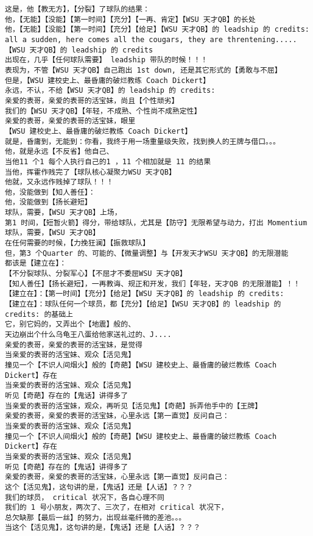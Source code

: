 \documentclass[9pt, b5paper]{article}
\begin{document}
\begin{verbatim}
这是，他【教无方】，【分裂】了球队的结果：
他，【无能】【没能】【第一时间】【充分】【一再、肯定】【WSU 天才QB】的长处
他，【无能】【没能】【第一时间】【充分】【给足】【WSU 天才QB】的 leadship 的 credits:
all a sudden, here comes all the cougars, they are threntening.....
【WSU 天才QB】的 leadship 的 credits
出现在，几乎【任何球队需要】 leadship 带队的时候！！！
表现为，不管【WSU 天才QB】自己跑出 1st down, 还是其它形式的【勇敢与不屈】
但是，【WSU 建校史上、最昏庸的破烂教练 Coach Dickert】
永远，不认，不给【WSU 天才QB】的 leadship 的 credits:
亲爱的表哥，亲爱的表哥的活宝妹，尚且【个性顽劣】
我们的【WSU 天才QB】【年轻，不成熟、个性尚不成熟定性】
亲爱的表哥，亲爱的表哥的活宝妹，眼里
【WSU 建校史上、最昏庸的破烂教练 Coach Dickert】
就是，昏庸到，无能到：你看，我终于用一场重量级失败，找到换人的王牌与借口。。。
他，就是永远【不反省】他自己、
当他11 个1 每个人执行自己的1 ，11 个相加就是 11 的结果
当他，挥霍作贱完了【球队核心凝聚力WSU 天才QB】
他就，又永远作贱掉了球队！！！
他，没能做到【知人善任】：
他，没能做到【扬长避短】
球队，需要，【WSU 天才QB】上场，
第1 时间，【短暂火箭】得分，带给球队，尤其是【防守】无限希望与动力，打出 Momentium
球队，需要，【WSU 天才QB】
在任何需要的时候，【力挽狂澜】【振救球队】
但，第3 个Quarter 的、可能的、【微量调整】与【开发天才WSU 天才QB】的无限潜能 
都该是【建立在】：
【不分裂球队、分裂军心】【不屈才不委屈WSU 天才QB】
【知人善任】【扬长避短】，一再教诲、规正和开发，我们【年轻，天才QB 的无限潜能】！！
【建立在】：【第一时间】【充分】【给足】【WSU 天才QB】的 leadship 的 credits:
【建立在】：球队任何一个球员，都【充分】【给足】【WSU 天才QB】的 leadship 的 credits: 的基础上
它，别它妈的，又弄出个【地震】般的、
天边崩出个什么乌龟王八蛋给他家送礼过的、J....
亲爱的表哥，亲爱的表哥的活宝妹，是觉得
当亲爱的表哥的活宝妹、观众【活见鬼】
撞见一个【不识人间烟火】般的【奇葩】【WSU 建校史上、最昏庸的破烂教练 Coach Dickert】存在
当亲爱的表哥的活宝妹、观众【活见鬼】
听见【奇葩】存在的【鬼话】讲得多了
当亲爱的表哥的活宝妹，观众，再听见【活见鬼】【奇葩】拆弄他手中的【王牌】
亲爱的表哥，亲爱的表哥的活宝妹，心里永远【第一直觉】反问自己：
当亲爱的表哥的活宝妹、观众【活见鬼】
撞见一个【不识人间烟火】般的【奇葩】【WSU 建校史上、最昏庸的破烂教练 Coach Dickert】存在
当亲爱的表哥的活宝妹、观众【活见鬼】
听见【奇葩】存在的【鬼话】讲得多了
亲爱的表哥，亲爱的表哥的活宝妹，心里永远【第一直觉】反问自己：
这个【活见鬼】，这句讲的是，【鬼话】还是【人话】？？？
我们的球员， critical 状况下，各自心理不同
我们的 1 号小朋友，两次了、三次了，在相对 critical 状况下，
总欠缺那【最后一丝】的努力，出现丝毫纤微的差池。。。
当这个【活见鬼】，这句讲的是，【鬼话】还是【人话】？？？

\end{verbatim}
\end{document}
